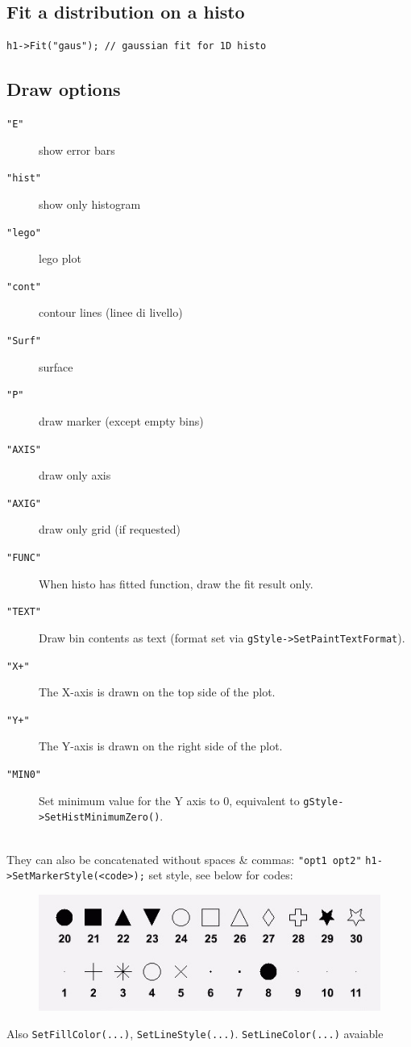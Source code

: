 \documentclass[10pt, oneside]{article}
\begin{document}
\subsection{Fit a distribution on a histo}
\begin{verbatim}
h1->Fit("gaus"); // gaussian fit for 1D histo
\end{verbatim}

\subsection{Draw options}
\begin{description}
\item[\texttt{"E"}] show error bars
\item[\texttt{"hist"}] show only histogram
\item[\texttt{"lego"}] lego plot
\item[\texttt{"cont"}] contour lines (linee di livello)
\item[\texttt{"Surf"}] surface
\item[\texttt{"P"}] draw marker (except empty bins)
\item[\texttt{"AXIS"}] draw only axis
\item[\texttt{"AXIG"}] draw only grid (if requested)
\item[\texttt{"FUNC"}]	When histo has fitted function, draw the fit result only.
\item[\texttt{"TEXT"}]	Draw bin contents as text (format set via 
\texttt{gStyle->SetPaintTextFormat}).
\item[\texttt{"X+"}]	The X-axis is drawn on the top side of the plot.
\item[\texttt{"Y+"}]	The Y-axis is drawn on the right side of the plot.
\item[\texttt{"MIN0"}] Set minimum value for the Y axis to $0$, equivalent to \texttt{gStyle->SetHistMinimumZero()}.
\end{description}

\\They can also be concatenated without spaces \& commas: \texttt{"opt1 opt2"}
\texttt{h1->SetMarkerStyle(<code>);} set style, see below for codes:
\begin{figure}
\centering
\includegraphics[scale=0.6]{shape.jpg}
\end{figure}
Also \texttt{SetFillColor(...)}, \texttt{SetLineStyle(...)}. \texttt{SetLineColor(...)} avaiable
\end{document}

